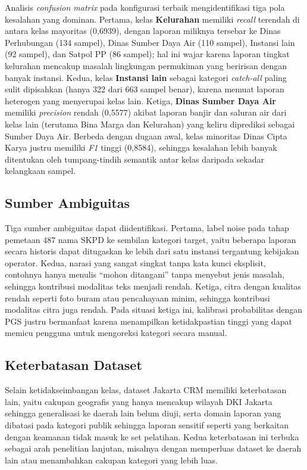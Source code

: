 Analisis \textit{confusion matrix} pada konfigurasi terbaik mengidentifikasi tiga pola kesalahan yang dominan. Pertama, kelas \textbf{Kelurahan} memiliki \textit{recall} terendah di antara kelas mayoritas (0,6939), dengan laporan miliknya tersebar ke Dinas Perhubungan (134 sampel), Dinas Sumber Daya Air (110 sampel), Instansi lain (92 sampel), dan Satpol PP (86 sampel); hal ini wajar karena laporan tingkat kelurahan mencakup masalah lingkungan permukiman yang beririsan dengan banyak instansi. Kedua, kelas \textbf{Instansi lain} sebagai kategori \textit{catch-all} paling sulit dipisahkan (hanya 322 dari 663 sampel benar), karena memuat laporan heterogen yang menyerupai kelas lain. Ketiga, \textbf{Dinas Sumber Daya Air} memiliki \textit{precision} rendah (0,5577) akibat laporan banjir dan saluran air dari kelas lain (terutama Bina Marga dan Kelurahan) yang keliru diprediksi sebagai Sumber Daya Air. Berbeda dengan dugaan awal, kelas minoritas Dinas Cipta Karya justru memiliki \textit{F1} tinggi (0,8584), sehingga kesalahan lebih banyak ditentukan oleh tumpang-tindih semantik antar kelas daripada sekadar kelangkaan sampel.

\subsection{Sumber Ambiguitas}

Tiga sumber ambiguitas dapat diidentifikasi. Pertama, label noise pada tahap pemetaan 487 nama SKPD ke sembilan kategori target, yaitu beberapa laporan secara historis dapat ditugaskan ke lebih dari satu instansi tergantung kebijakan operator. Kedua, narasi yang sangat singkat tanpa kata kunci eksplisit, contohnya hanya menulis ``mohon ditangani'' tanpa menyebut jenis masalah, sehingga kontribusi modalitas teks menjadi rendah. Ketiga, citra dengan kualitas rendah seperti foto buram atau pencahayaan minim, sehingga kontribusi modalitas citra juga rendah. Pada situasi ketiga ini, kalibrasi probabilitas dengan PGS justru bermanfaat karena menampilkan ketidakpastian tinggi yang dapat memicu pengguna untuk mengoreksi kategori secara manual.

\subsection{Keterbatasan Dataset}

Selain ketidakseimbangan kelas, dataset Jakarta CRM memiliki keterbatasan lain, yaitu cakupan geografis yang hanya mencakup wilayah DKI Jakarta sehingga generalisasi ke daerah lain belum diuji, serta domain laporan yang dibatasi pada kategori publik sehingga laporan sensitif seperti yang berkaitan dengan keamanan tidak masuk ke set pelatihan. Kedua keterbatasan ini terbuka sebagai arah penelitian lanjutan, misalnya dengan memperluas dataset ke daerah lain atau menambahkan cakupan kategori yang lebih luas.

